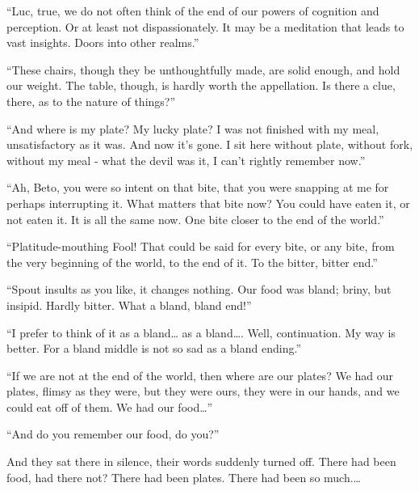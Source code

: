 ``Luc, true, we do not often think of the end of our powers of cognition
and perception. Or at least not dispassionately. It may be a meditation
that leads to vast insights. Doors into other realms.''

``These chairs, though they be unthoughtfully made, are solid enough,
and hold our weight. The table, though, is hardly worth the appellation.
Is there a clue, there, as to the nature of things?''

``And where is my plate? My lucky plate? I was not finished with my
meal, unsatisfactory as it was. And now it's gone. I sit here without
plate, without fork, without my meal - what the devil was it, I can't
rightly remember now.''

``Ah, Beto, you were so intent on that bite, that you were snapping at
me for perhaps interrupting it. What matters that bite now? You could
have eaten it, or not eaten it. It is all the same now. One bite closer
to the end of the world.''

``Platitude-mouthing Fool! That could be said for every bite, or any
bite, from the very beginning of the world, to the end of it. To the
bitter, bitter end.''

``Spout insults as you like, it changes nothing. Our food was bland;
briny, but insipid. Hardly bitter. What a bland, bland end!''

``I prefer to think of it as a bland\ldots{} as a bland\ldots{}. Well,
continuation. My way is better. For a bland middle is not so sad as a
bland ending.''

``If we are not at the end of the world, then where are our plates? We
had our plates, flimsy as they were, but they were ours, they were in
our hands, and we could eat off of them. We had our food\ldots{}''

``And do you remember our food, do you?''

And they sat there in silence, their words suddenly turned off. There
had been food, had there not? There had been plates. There had been so
much.\ldots
